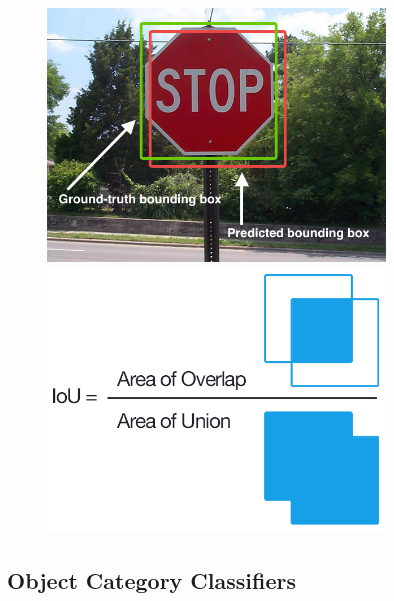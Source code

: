 \documentclass{article}
\begin{document}
\begin{figure}[htbp]
    \centering
    \begin{minipage}{0.45\textwidth}
        \centering
        \includegraphics[width=0.8\textwidth]{iou_stop_sign.jpg} %
    \end{minipage}\hfill
    \begin{minipage}{0.45\textwidth}
        \centering
        \includegraphics[width=0.8\textwidth]{iou_equation.png} %
    \end{minipage}
\end{figure}

\subsection{Object Category Classifiers}
\end{document}
